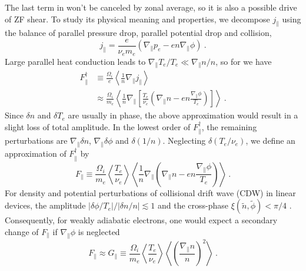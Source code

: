 \documentclass[aps,pre,twocolumn,superscriptaddress]{revtex4-2}
\begin{document}
The last term in  won't be canceled by zonal average, so it is also a possible drive of ZF shear. To study its physical meaning and properties, we decompose $j_{\parallel}$ using the balance of parallel pressure drop, parallel potential drop and collision, 
\begin{equation}
j_{\parallel}=\frac{e}{\nu_{e}m_{e}}\left(\nabla_{\parallel}p_{e}-en\nabla_{\parallel}\phi\right)~.
\label{eq:Ohm}
\end{equation}
Large parallel heat conduction leads to $\nabla_{\parallel}T_{e}/T_{e}\ll\nabla_{\parallel}n/n$, so for  we have
\begin{equation}
\begin{aligned}
	F_{\parallel}^{\dagger}
	&\equiv\frac{\Omega_{i}}{e}\left<\frac{1}{n}
	\nabla_{\parallel}j_{\parallel}\right> \\
	&\approx\frac{\Omega_{i}}{m_{e}}\left<\frac{1}{n}\nabla_{\parallel}
	\left[\frac{T_{e}}{\nu_{e}}\left(\nabla_{\parallel}n-en\frac{\nabla_{\parallel}
	\phi}{T_{e}}\right)\right]\right>~.
\label{eq:Fpar_dagger}
\end{aligned}
\end{equation}
Since $\delta n$ and $\delta T_{e}$ are usually in phase, the above approximation would result in a slight loss of total amplitude. In the lowest order of $F_{\parallel}^{\dagger}$, the remaining perturbations are $\nabla_{\parallel}\delta n$, $\nabla_{\parallel}\delta\phi$ and $\delta\left(1/n\right)$. Neglecting $\delta\left(T_{e}/\nu_{e}\right)$, we define an approximation of $F_{\parallel}^{\dagger}$ by
\begin{equation}
	F_{\parallel}\equiv\frac{\Omega_{i}}{m_{e}}\left<\frac{T_{e}}{\nu_{e}}\right>
	\left<\frac{1}{n}\nabla_{\parallel}
	\left(\nabla_{\parallel}n-en\frac{\nabla_{\parallel}
	\phi}{T_{e}}\right)\right>~.
\label{eq:Fpar}
\end{equation}
For density and potential perturbations of collisional drift wave (CDW) in linear devices, the amplitude $\left|\delta\phi/T_{e}\right|/\left|\delta n/n\right|\apprle 1$ and the cross-phase $\xi\left(\tilde{n},\tilde{\phi}\right)<\pi/4$ \cite{Thakur_2014,doi:10.1063/1.1694135}. Consequently, for weakly adiabatic electrons, one would expect a secondary change of $F_{\parallel}$ if $\nabla_{\parallel}\phi$ is neglected
\begin{equation}
	F_{\parallel}\approx G_{\parallel}
	\equiv \frac{\Omega_{i}}{m_{e}}\left<\frac{T_{e}}{\nu_{e}}\right>
	\left<\left(\frac{\nabla_{\parallel}n}{n}\right)^{2}\right>~.
\label{eq:Gpar}
\end{equation}
\end{document}
